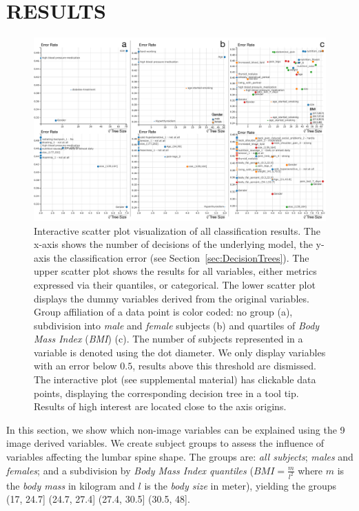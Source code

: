 \documentclass[a4paper,twoside]{style/article}
\begin{document}
\section{\uppercase{Results}}
\begin{figure}[!t]
  \centering
  \includegraphics[width=1\textwidth]{figures/results}
  \caption{
Interactive scatter plot visualization of all classification results.
The x-axis shows the number of decisions of the underlying model, the y-axis the classification error (see Section~\ref{sec:DecisionTrees}).
The upper scatter plot shows the results for all variables, either metrics expressed via their quantiles, or categorical.
The lower scatter plot displays the dummy variables derived from the original variables.
Group affiliation of a data point is color coded:
no group (a), subdivision into \emph{male} and \emph{female} subjects (b) and quartiles of \emph{Body Mass Index} (\emph{BMI}) (c). %
The number of subjects represented in a variable is denoted using the dot diameter.
We only display variables with an error below $0.5$, results above this threshold are dismissed.
The interactive plot (see supplemental material) has clickable data points, displaying the corresponding decision tree in a tool tip.
Results of high interest are located close to the axis origins.
}
  \label{fig:results}
\end{figure}
\noindent In this section, we show which non-image variables can be explained using the 9 image derived variables.
We create subject groups to assess the influence of variables affecting the lumbar spine shape.
The groups are: \emph{all subjects}; \emph{males} and \emph{females}; and a subdivision by \emph{Body Mass Index quantiles} ($BMI = \frac{m}{l^2}$ where $m$ is the \emph{body mass} in kilogram and $l$ is the \emph{body size} in meter), yielding the groups (17, 24.7] (24.7, 27.4] (27.4, 30.5] (30.5, 48].
\end{document}
